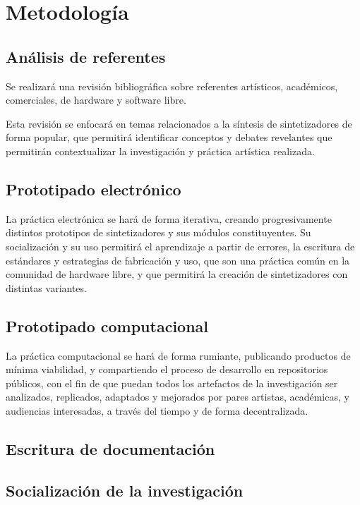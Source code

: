 \documentclass[../proyecto.tex]{subfiles}
\begin{document}
\chapter{Metodología}


\section{Análisis de referentes}

Se realizará una revisión bibliográfica sobre referentes artísticos, académicos, comerciales, de hardware y software libre.

Esta revisión se enfocará en temas relacionados a la síntesis de sintetizadores de forma popular, que permitirá identificar conceptos y debates revelantes que permitirán contextualizar la investigación y práctica artística realizada.

\section{Prototipado electrónico}

La práctica electrónica se hará de forma iterativa, creando progresivamente distintos prototipos de sintetizadores y sus módulos constituyentes. Su socialización y su uso permitirá el aprendizaje a partir de errores, la escritura de estándares y estrategias de fabricación y uso, que son una práctica común en la comunidad de hardware libre, y que permitirá la creación de sintetizadores con distintas variantes.

\section{Prototipado computacional}

La práctica computacional se hará de forma rumiante, publicando productos de mínima viabilidad, y compartiendo el proceso de desarrollo en repositorios públicos, con el fin de que puedan todos los artefactos de la investigación ser analizados, replicados, adaptados y mejorados por pares artistas, académicas, y audiencias interesadas, a través del tiempo y de forma decentralizada.

\section{Escritura de documentación}

\section{Socialización de la investigación}
\end{document}
